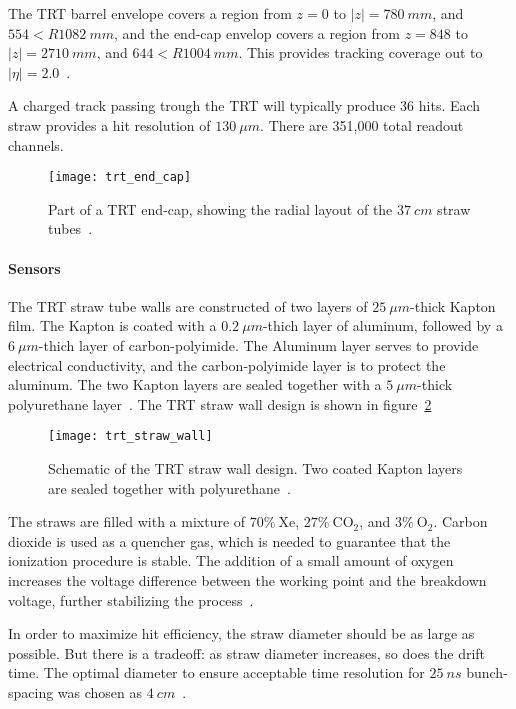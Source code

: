 The TRT barrel envelope covers a region from $z = 0$ to $|z|  = 780~mm$, and $554 < R 1082~mm$,
and the end-cap envelop covers a region from $z = 848$ to $|z|  = 2710~mm$, and $644 < R 1004~mm$.
This provides tracking coverage out to $|\eta| = 2.0$~\cite{atlas-detector-2008}.

A charged track passing trough the TRT will typically produce 36 hits.
Each straw provides a hit resolution of $130~\mu m$.
There are 351,000 total readout channels.

\begin{figure}[!ht]\centering
\texttt{[image: trt\_end\_cap]}
\caption{Part of a TRT end-cap, showing the radial layout of the $37~cm$ straw tubes~\cite{trt-2013}.}
\label{fig:trt_end_cap}
\end{figure}

\paragraph{Sensors}

The TRT straw tube walls are constructed of two layers of $25~\mu m$-thick Kapton film.
The Kapton is coated with a $0.2~\mu m$-thich layer of aluminum, followed by a $6~\mu m$-thich layer of carbon-polyimide.
The Aluminum layer serves to provide electrical conductivity, and the carbon-polyimide layer is to protect the aluminum.
The two Kapton layers are sealed together with a $5~\mu m$-thick polyurethane layer~\cite{trt-2013}.
The TRT straw wall design is shown in figure~\ref{fig:trt_straw_wall}

\begin{figure}[!ht]\centering
\texttt{[image: trt\_straw\_wall]}
\caption{Schematic of the TRT straw wall design. Two coated Kapton layers are sealed together with polyurethane~\cite{trt-2013}.}
\label{fig:trt_straw_wall}
\end{figure}

The straws are filled with a mixture of $70\%~\mathrm{Xe}$, $27\%~\mathrm{CO_2}$,
and $3\%~\mathrm{O_2}$.
Carbon dioxide is used as a quencher gas, which is needed to guarantee that the ionization procedure is stable.
The addition of a small amount of oxygen increases the voltage difference between the working point and the breakdown voltage,
further stabilizing the process~\cite{trt-2013}.

In order to maximize hit efficiency, the straw diameter should be as large as possible.
But there is a tradeoff: as straw diameter increases, so does the drift time.
The optimal diameter to ensure acceptable time resolution for $25~ns$ bunch-spacing was chosen as $4~cm$~\cite{trt-2013}.

